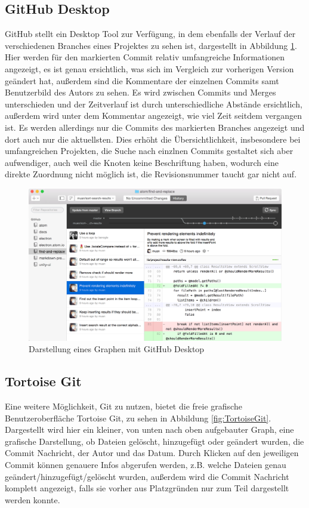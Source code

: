 \documentclass[nocolor]{tudbook}
\begin{document}
\subsection{GitHub Desktop}
GitHub stellt ein Desktop Tool zur Verfügung, in dem ebenfalls der Verlauf der verschiedenen Branches eines Projektes zu sehen ist, dargestellt in Abbildung \ref{fig:GitHubDesktop}. Hier werden für den markierten Commit relativ umfangreiche Informationen angezeigt, es ist genau ersichtlich, was sich im Vergleich zur vorherigen Version geändert hat, außerdem sind die Kommentare der einzelnen Commits samt Benutzerbild des Autors zu sehen. Es wird zwischen Commits und Merges unterschieden und der Zeitverlauf ist durch unterschiedliche Abstände ersichtlich, außerdem wird unter dem Kommentar angezeigt, wie viel Zeit seitdem vergangen ist. Es werden allerdings nur die Commits des markierten Branches angezeigt und dort auch nur die aktuellsten. Dies erhöht die Übersichtlichkeit, insbesondere bei umfangreichen Projekten, die Suche nach einzlnen Commits gestaltet sich aber aufwendiger, auch weil die Knoten keine Beschriftung haben, wodurch eine direkte Zuordnung nicht möglich ist, die Revisionsnummer taucht gar nicht auf.

\begin{figure}[htb] 
  \centering
     \includegraphics[width=\textwidth]{GitHubDesktop.png}
  \caption[Darstellung eines Graphen mit GitHub Dekstop, entnommen von \GitHubDesktop, abgerufen am 24.11.2015]{Darstellung eines Graphen mit GitHub Desktop}
  \label{fig:GitHubDesktop}
\end{figure}

\subsection{Tortoise Git}
Eine weitere Möglichkeit, Git zu nutzen, bietet die freie grafische Benutzeroberfläche Tortoise Git, zu sehen in Abbildung \ref{fig:TortoiseGit}. Dargestellt wird hier ein kleiner, von unten nach oben aufgebauter Graph, eine grafische Darstellung, ob Dateien gelöscht, hinzugefügt oder geändert wurden, die Commit Nachricht, der Autor und das Datum. Durch Klicken auf den jeweiligen Commit können genauere Infos abgerufen werden, z.B. welche Dateien genau geändert/hinzugefügt/gelöscht wurden, außerdem wird die Commit Nachricht komplett angezeigt, falls sie vorher aus Platzgründen nur zum Teil dargestellt werden konnte.
\end{document}
